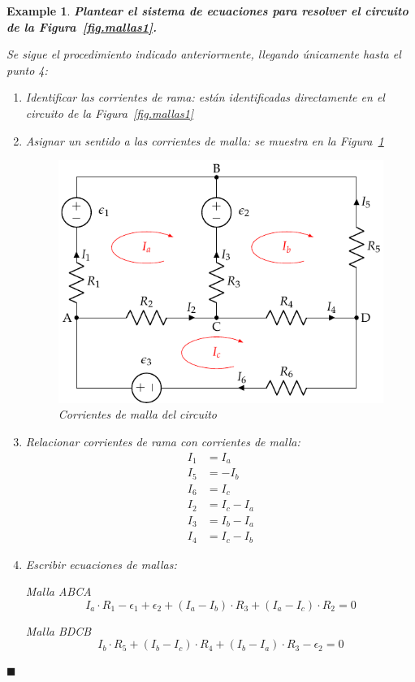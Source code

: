\documentclass[11pt]{book} %
\numberwithin{dummy}{section}
\theoremstyle{ocrenumbox}
\theoremstyle{blacknumex}
\newtheorem{exampleT}{Example}[chapter]
\theoremstyle{blacknumbox}
\theoremstyle{ocrenum}
\newenvironment{example}{\begin{exampleT}}{\hfill{\tiny\ensuremath{\blacksquare}}\end{exampleT}}
\begin{document}
	\vspace{4mm}
	\begin{example}
		\label{ej.1-5}
		\textbf{Plantear el sistema de ecuaciones para resolver el circuito de la Figura~\ref{fig.mallas1}.}
		
		Se sigue el procedimiento indicado anteriormente, llegando únicamente hasta el punto 4: 
		\begin{enumerate}
			\item Identificar las corrientes de rama: están identificadas directamente en el circuito de la Figura~\ref{fig.mallas1}
			\item Asignar un sentido a las corrientes de malla: se muestra en la Figura~\ref{fig.mallas1_corrientes}
			\begin{figure}[htbp]
				\centering
				\includegraphics[width=0.35\linewidth]{../figs/mallas1_corrientes.pdf}
				\caption{Corrientes de malla del circuito}
				\label{fig.mallas1_corrientes}
			\end{figure}
			\item Relacionar corrientes de rama con corrientes de malla:
			\begin{align*}
				I_1 &= I_a\\
				I_5 &= -I_b\\
				I_6 &= I_c\\
				I_2 &= I_c -I_a\\
				I_3 &= I_b - I_a\\
				I_4 &= I_c - I_b
			\end{align*}
			\item Escribir ecuaciones de mallas: 
			
			Malla ABCA
			\begin{equation*}
				I_a \cdot R_1 - \epsilon_1 + \epsilon_2 + (I_a - I_b) \cdot R_3 + (I_a - I_c) \cdot R_2 = 0
			\end{equation*}
			
			Malla BDCB
			\begin{equation*}
				I_b \cdot R_5 + (I_b - I_c) \cdot R_4 + (I_b - I_a) \cdot R_3 - \epsilon_2 = 0
			\end{equation*}
			

\end{enumerate}
\end{example}
\end{document}
